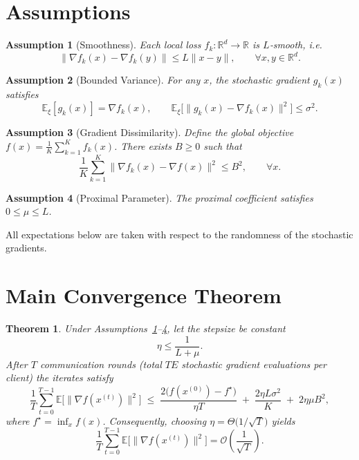 \documentclass[11pt]{article}
\newtheorem{theorem}{Theorem}
\newtheorem{assumption}{Assumption}
\newcommand{\E}{\mathbb{E}}
\newcommand{\R}{\mathbb{R}}
\begin{document}
\section*{Assumptions}
\begin{assumption}[Smoothness]\label{ass:smooth}
Each local loss $f_k:\R^{d}\to\R$ is $L$‑smooth, i.e.
\[
\|\nabla f_k(x)-\nabla f_k(y)\|\le L\|x-y\|,\qquad\forall x,y\in\R^{d}.
\]
\end{assumption}
\begin{assumption}[Bounded Variance]\label{ass:variance}
For any $x$, the stochastic gradient $g_{k}(x)$ satisfies
\[
\E_{\xi}[g_{k}(x)] = \nabla f_k(x),\qquad
\E_{\xi}\!\bigl[\|g_{k}(x)-\nabla f_k(x)\|^{2}\bigr]\le\sigma^{2}.
\]
\end{assumption}
\begin{assumption}[Gradient Dissimilarity]\label{ass:dissimilarity}
Define the global objective $f(x)=\frac1K\sum_{k=1}^{K}f_k(x)$. There exists $B\ge0$ such that
\[
\frac1K\sum_{k=1}^{K}\|\nabla f_k(x)-\nabla f(x)\|^{2}\le B^{2},\qquad\forall x.
\]
\end{assumption}
\begin{assumption}[Proximal Parameter]\label{ass:mu}
The proximal coefficient satisfies $0\le\mu\le L$.
\end{assumption}
All expectations below are taken with respect to the randomness of the stochastic gradients.

\section*{Main Convergence Theorem}
\begin{theorem}\label{thm:main}
Under Assumptions~\ref{ass:smooth}–\ref{ass:mu}, let the stepsize be constant
\[
\eta\le \frac{1}{L+\mu}.
\]
After $T$ communication rounds (total $TE$ stochastic gradient evaluations per client) the iterates satisfy
\[
\frac{1}{T}\sum_{t=0}^{T-1}\E\!\bigl[\|\nabla f(x^{(t)})\|^{2}\bigr]
\;\le\;
\frac{2\bigl(f(x^{(0)})-f^{\star}\bigr)}{\eta T}
\;+\;
\frac{2\eta L\sigma^{2}}{K}
\;+\;
2\eta\mu B^{2},
\]
where $f^{\star}=\inf_{x}f(x)$. Consequently, choosing $\eta =\Theta\!\bigl(1/\sqrt{T}\bigr)$ yields
\[
\frac{1}{T}\sum_{t=0}^{T-1}\E\!\bigl[\|\nabla f(x^{(t)})\|^{2}\bigr]=\mathcal O\!\left(\frac{1}{\sqrt{T}}\right).
\]
\end{theorem}
\end{document}
